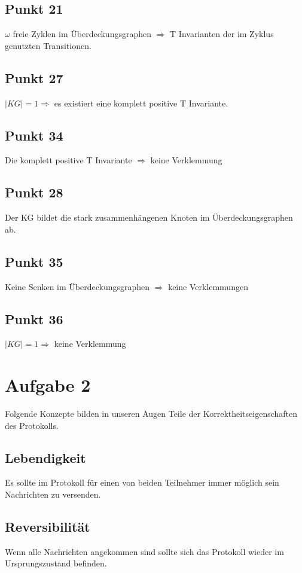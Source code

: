 \documentclass[10pt]{scrartcl}
\begin{document}
				\subsection{Punkt 21}
				$\omega$ freie Zyklen im Überdeckungsgraphen $\Longrightarrow$ T Invarianten der im Zyklus genutzten Transitionen.
				
				\subsection{Punkt 27}
				$|KG| = 1 \Longrightarrow $ es existiert eine komplett positive T Invariante.
				
				\subsection{Punkt 34}
				Die komplett positive T Invariante $\Longrightarrow$ keine Verklemmung
				
				\subsection{Punkt 28}
				Der KG bildet die stark zusammenhängenen Knoten im Überdeckungsgraphen ab.
				
				\subsection{Punkt 35}
				Keine Senken im Überdeckungsgraphen $\Longrightarrow$ keine Verklemmungen
				
				\subsection{Punkt 36}
				$|KG| = 1 \Longrightarrow $ keine Verklemmung 
				
				\section{Aufgabe 2}
				Folgende Konzepte bilden in unseren Augen Teile der Korrektheitseigenschaften des Protokolls.
				\subsection{Lebendigkeit}
				Es sollte im Protokoll für einen von beiden Teilnehmer immer möglich sein Nachrichten zu versenden.
				
				\subsection{Reversibilität}
				Wenn alle Nachrichten angekommen sind sollte sich das Protokoll wieder im Ursprungszustand befinden.
				
\end{document}
